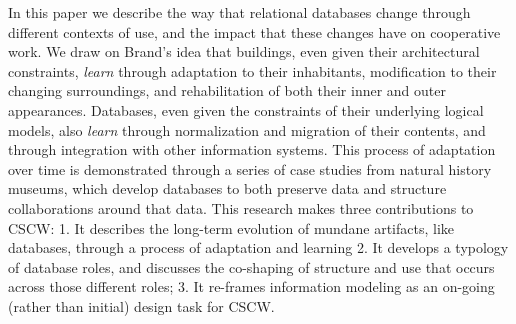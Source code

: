 In this paper we describe the way that relational databases change through different contexts of use, and the impact that these changes have on cooperative work. We draw on Brand's idea that buildings, even given their architectural constraints, \emph{learn} through adaptation to their inhabitants, modification to their changing surroundings, and rehabilitation of both their inner and outer appearances. Databases, even given the constraints of their underlying logical models, also \emph{learn} through normalization and migration of their contents, and through integration with other information systems. This process of adaptation over time is demonstrated through a series of case studies from natural history museums, which develop databases to both preserve data and structure collaborations around that data. This research makes three contributions to CSCW: 1. It describes the long-term evolution of mundane artifacts, like databases, through a process of adaptation and learning 2. It develops a typology of database roles, and discusses the co-shaping of structure and use that occurs across those different roles; 3. It re-frames information modeling as an on-going (rather than initial) design task for CSCW.